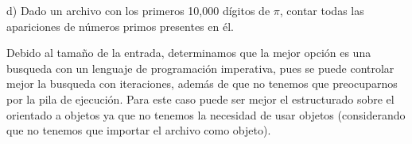 \Large

d) Dado un archivo con los primeros 10,000 dígitos de $\pi$, contar todas las apariciones de números primos presentes en él.\\
\newline
\large

Debido al tamaño de la entrada, determinamos que la mejor opción es una busqueda con un lenguaje de programación imperativa, pues
se puede controlar mejor la busqueda con iteraciones, además de que no tenemos que preocuparnos por la pila de ejecución. Para este caso
puede ser mejor el estructurado sobre el orientado a objetos ya que no tenemos la necesidad de usar objetos (considerando que no tenemos que importar el archivo como objeto).